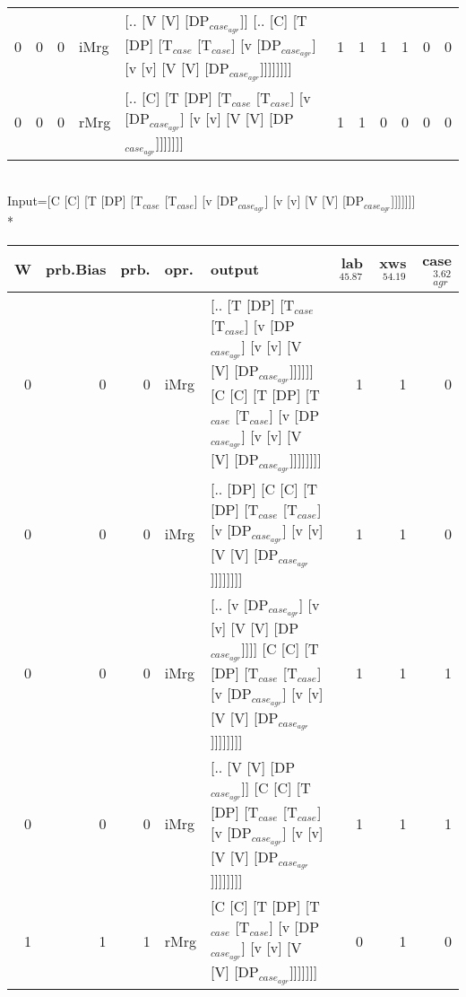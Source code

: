 \begin{tabularx}{\linewidth}{rrrlXrrrrrr}
   0 &       0 &   0 & iMrg & [.. [V [V] [DP$_{case_{agr}}$]] [.. [C] [T [DP] [T$_{case}$ [T$_{case}$] [v [DP$_{case_{agr}}$] [v [v] [V [V] [DP$_{case_{agr}}$]]]]]]]]                                                      &             1 &             1 &                  1 &            1 &              0 &             0 \\
   0 &       0 &   0 & rMrg & [.. [C] [T [DP] [T$_{case}$ [T$_{case}$] [v [DP$_{case_{agr}}$] [v [v] [V [V] [DP$_{case_{agr}}$]]]]]]]                                                                                 &             1 &             1 &                  0 &            0 &              0 &             0 \\
\hline
\end{tabularx}\endgroup\\
\begingroup\scriptsize Input=[C [C] [T [DP] [T$_{case}$ [T$_{case}$] [v [DP$_{case_{agr}}$] [v [v] [V [V] [DP$_{case_{agr}}$]]]]]]]\\*
\begin{tabularx}{\linewidth}{rrrlXrrr}
\hline
   W &   prb.Bias &   prb. & opr.   & output                                                                                                                                                             &   lab$^{45.87}$ &   xws$^{54.19}$ &   case$_{agr}^{3.62}$ \\
\hline
   0 &       0 &   0 & iMrg & [.. [T [DP] [T$_{case}$ [T$_{case}$] [v [DP$_{case_{agr}}$] [v [v] [V [V] [DP$_{case_{agr}}$]]]]]] [C [C] [T [DP] [T$_{case}$ [T$_{case}$] [v [DP$_{case_{agr}}$] [v [v] [V [V] [DP$_{case_{agr}}$]]]]]]]] &             1 &             1 &                  0 \\
   0 &       0 &   0 & iMrg & [.. [DP] [C [C] [T [DP] [T$_{case}$ [T$_{case}$] [v [DP$_{case_{agr}}$] [v [v] [V [V] [DP$_{case_{agr}}$]]]]]]]]                                                                       &             1 &             1 &                  0 \\
   0 &       0 &   0 & iMrg & [.. [v [DP$_{case_{agr}}$] [v [v] [V [V] [DP$_{case_{agr}}$]]]] [C [C] [T [DP] [T$_{case}$ [T$_{case}$] [v [DP$_{case_{agr}}$] [v [v] [V [V] [DP$_{case_{agr}}$]]]]]]]]                            &             1 &             1 &                  1 \\
   0 &       0 &   0 & iMrg & [.. [V [V] [DP$_{case_{agr}}$]] [C [C] [T [DP] [T$_{case}$ [T$_{case}$] [v [DP$_{case_{agr}}$] [v [v] [V [V] [DP$_{case_{agr}}$]]]]]]]]                                                      &             1 &             1 &                  1 \\
   1 &       1 &   1 & rMrg & [C [C] [T [DP] [T$_{case}$ [T$_{case}$] [v [DP$_{case_{agr}}$] [v [v] [V [V] [DP$_{case_{agr}}$]]]]]]]                                                                                 &             0 &             1 &                  0 \\
\hline
\end{tabularx}\endgroup\\
